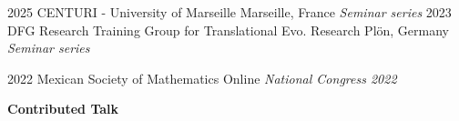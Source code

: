 \documentclass[]{friggeri-cv} %
\begin{document}
\begin{entrylist}
\entry
{2025}
{}
{CENTURI - University of Marseille}
{Marseille, France}
{{\normalsize\emph{Seminar series}}}
{\vspace{-3mm}}
\entry
{2023}
{}
{DFG Research Training Group for Translational Evo. Research}
{Plön, Germany}
{{\normalsize\emph{Seminar series}}}
{\vspace{-3mm}}
\end{entrylist}
\begin{entrylist}
\entry
{2022}
{}
{Mexican Society of Mathematics}
{Online}
{{\normalsize\emph{National Congress 2022}}}
{\vspace{-3mm}}
\end{entrylist}

\textbf{Contributed Talk}
\end{document}
